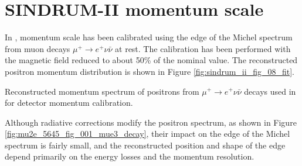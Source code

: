 \newpage
\section {SINDRUM-II momentum scale }

In \cite{sindrum_ii:Bertl2006}, momentum scale has been calibrated using
the edge of the Michel spectrum from muon decays $\mu^+ \rightarrow e^+ \nu \bar{\nu}$
at rest. The calibration has been performed with the magnetic field reduced to about 50\%
of the nominal value. The reconstructed positron momentum distribution is shown
in Figure \ref{fig:sindrum_ii_fig_08_fit}.

\vspace{0.1in}
 {
  \label{fig:sindrum_ii_fig_08_fit}
  Reconstructed momentum spectrum of positrons from $\mu^+ \rightarrow e^+ \nu \bar{\nu}$
  decays used in \cite{sindrum_ii:Bertl2006} for detector momentum calibration.
}
\vspace{0.1in}

Although radiative corrections modify the positron spectrum, as shown in Figure \ref{fig:mu2e_5645_fig_001_mue3_decay}, their impact on the edge of the Michel spectrum
is fairly small, and the reconstructed position and shape of the edge depend primarily
on the energy losses and the momentum resolution.


